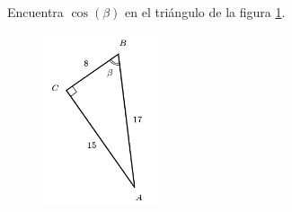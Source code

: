 \question[15] Encuentra $\cos(\beta)$ en el triángulo de la figura \ref{fig:functrig02}.
\begin{figure}[H]
    \begin{center}
        \includegraphics[width=0.3\textwidth]{../images/functrig02.png}
    \end{center}
    \caption{}
    \label{fig:functrig02}
\end{figure}
